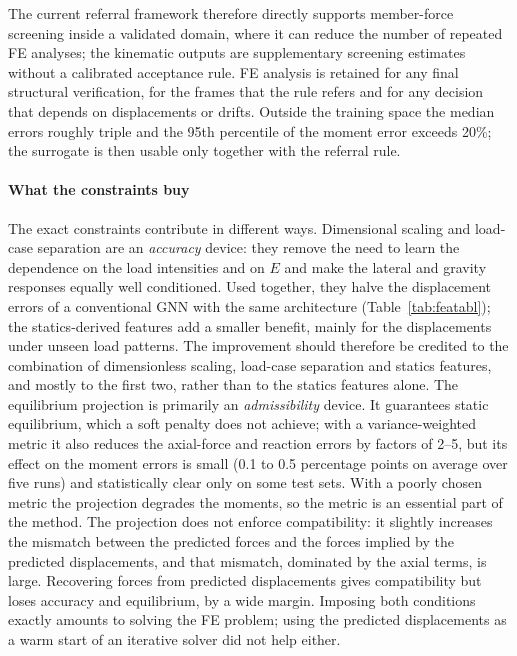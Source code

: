The current referral framework therefore directly supports member-force screening inside a validated domain, where it can reduce the number of repeated FE analyses; the kinematic outputs are supplementary screening estimates without a calibrated acceptance rule. FE analysis is retained for any final structural verification, for the frames that the rule refers and for any decision that depends on displacements or drifts. Outside the training space the median errors roughly triple and the 95th percentile of the moment error exceeds 20\%; the surrogate is then usable only together with the referral rule.

\paragraph{What the constraints buy} The exact constraints contribute in different ways. Dimensional scaling and load-case separation are an \emph{accuracy} device: they remove the need to learn the dependence on the load intensities and on $E$ and make the lateral and gravity responses equally well conditioned. Used together, they halve the displacement errors of a conventional GNN with the same architecture (Table~\ref{tab:featabl}); the statics-derived features add a smaller benefit, mainly for the displacements under unseen load patterns. The improvement should therefore be credited to the combination of dimensionless scaling, load-case separation and statics features, and mostly to the first two, rather than to the statics features alone. The equilibrium projection is primarily an \emph{admissibility} device. It guarantees static equilibrium, which a soft penalty does not achieve; with a variance-weighted metric it also reduces the axial-force and reaction errors by factors of 2--5, but its effect on the moment errors is small (0.1 to 0.5 percentage points on average over five runs) and statistically clear only on some test sets. With a poorly chosen metric the projection degrades the moments, so the metric is an essential part of the method. The projection does not enforce compatibility: it slightly increases the mismatch between the predicted forces and the forces implied by the predicted displacements, and that mismatch, dominated by the axial terms, is large. Recovering forces from predicted displacements gives compatibility but loses accuracy and equilibrium, by a wide margin. Imposing both conditions exactly amounts to solving the FE problem; using the predicted displacements as a warm start of an iterative solver did not help either.

